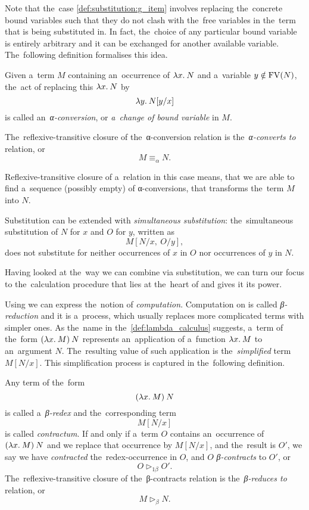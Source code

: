 Note that the~case \ref{def:substitution:g_item} involves replacing the~concrete
bound variables such that they do not clash with the~free variables in the~term
that is being substituted in. In fact, the~choice of any particular bound
variable is entirely arbitrary and it can be exchanged for another available
variable. The~following definition formalises this idea.

\begin{definition}
  Given a~term $M$ containing an~occurrence of $\lambda x . \: N$ and a~variable $y
  \notin \mathrm{FV}(N)$, the~act of replacing this $\lambda x . \: N$ by
  \[
    \lambda y . \: N[y/x]
  \]
  is called an~\emph{α-conversion}, or \emph{a~change of bound variable} in $M$.

  The~reflexive-transitive closure of the~α-conversion relation is
  the~\emph{α-converts to} relation, or
  \[
    M \equiv_\alpha N.
  \]
\end{definition}

Reflexive-transitive closure of a~relation in this case means, that we are able
to find a~sequence (possibly empty) of α-conversions, that transforms the~term
$M$ into $N$.

Substitution can be extended with \emph{simultaneous substitution}:
the~simultaneous substitution of $N$ for $x$ and $O$ for $y$, written as
\[
  M[N/x, \: O/y],
\]
does not substitute for neither occurrences of $x$ in $O$ nor occurrences of $y$
in $N$.

Having looked at the~way we can combine \lts via substitution, we can turn our
focus to the~calculation procedure that lies at the~heart of \lc and gives it
its power.


Using \lc we can express the~notion of \emph{computation}. Computation on \lts
is called \emph{β-reduction} and it is a~process, which usually replaces more
complicated terms with simpler ones. As the~name in
the~\autoref{def:lambda_calculus} suggests, a~term of the~form $(\lambda x . \: M) \: N$
represents an~application of a~function $\lambda x . \: M$ to an~argument $N$.
The~resulting value of such application is the~\emph{simplified} term $M[N/x]$.
This simplification process is captured in the~following definition.

\begin{definition}
  Any term of the~form
  \[
    (\lambda x . \: M) \: N
  \]
  is called a~\emph{β-redex} and the~corresponding term
  \[
    M[N/x]
  \]
  is called \emph{contractum}. If and only if a~term $O$ contains an~occurrence
  of $(\lambda x . \: M) \: N$ and we replace that occurrence by $M[N/x]$, and
  the~result is $O'$, we say we have \emph{contracted} the~redex-occurrence in
  $O$, and $O$ \emph{β-contracts} to $O'$, or
  \[
    O \triangleright_{1\beta} O'.
  \]
  The~reflexive-transitive closure of the~β-contracts relation is
  the~\emph{β-reduces to} relation, or
  \[
    M \triangleright_\beta N.
  \]
\end{definition}

